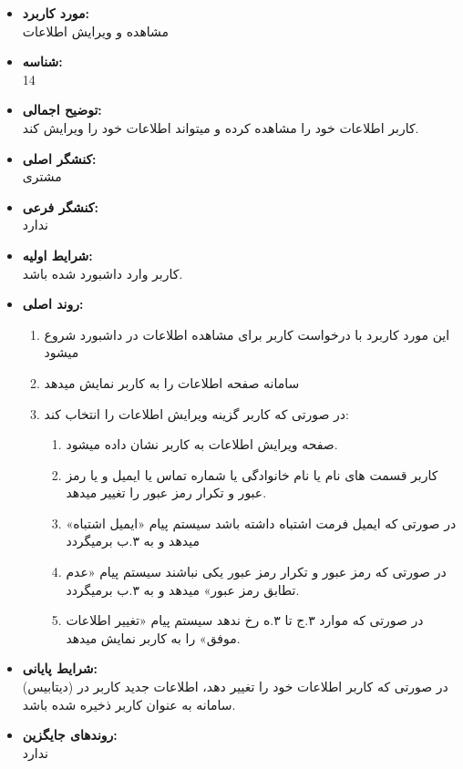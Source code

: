 \documentclass{article}
\begin{document}
\begin{itemize}
\item \textbf{مورد کاربرد:}\\
مشاهده و ویرایش اطلاعات
\item \textbf{شناسه:}\\
14
\item \textbf{توضیح اجمالی:}\\
کاربر اطلاعات خود را مشاهده کرده و میتواند اطلاعات خود را ویرایش کند.
\item \textbf{کنشگر اصلی:}\\
مشتری
\item \textbf{کنشگر فرعی:}\\
ندارد
\item \textbf{شرایط اولیه:}\\
کاربر وارد داشبورد شده باشد.
\item \textbf{روند اصلی:}\\
\begin{enumerate}
\item  این مورد کاربرد با درخواست کاربر برای مشاهده اطلاعات در داشبورد شروع میشود
\item سامانه صفحه  اطلاعات را به کاربر نمایش میدهد
\item در صورتی که کاربر گزینه ویرایش اطلاعات را انتخاب کند:
\begin{enumerate}
\item صفحه ویرایش اطلاعات به کاربر نشان داده میشود.
\item کاربر قسمت های نام یا نام خانوادگی یا شماره تماس یا ایمیل و یا رمز عبور و تکرار رمز عبور را تغییر میدهد.
\item  در صورتی که ایمیل فرمت اشتباه داشته باشد سیستم پیام «ایمیل اشتباه» میدهد و به ۳.ب برمیگردد
\item در صورتی که رمز عبور و تکرار رمز عبور یکی نباشند سیستم پیام «عدم تطابق رمز عبور» میدهد و به ۳.ب برمیگردد.
\item در صورتی که موارد ۳.ج تا ۳.ه رخ ندهد سیستم پیام «تغییر اطلاعات موفق» را به کاربر نمایش میدهد.
\end{enumerate}
\end{enumerate}
\item \textbf{شرایط پایانی:}\\ 
در صورتی که کاربر اطلاعات خود را تغییر دهد، اطلاعات جدید کاربر در (دیتابیس) سامانه به عنوان کاربر ذخیره شده باشد.
\item \textbf{روندهای جایگزین:}\\
ندارد
\end{itemize}
\noindent\makebox[\linewidth]{\rule{\paperwidth}{0.4pt}}
\end{document}
